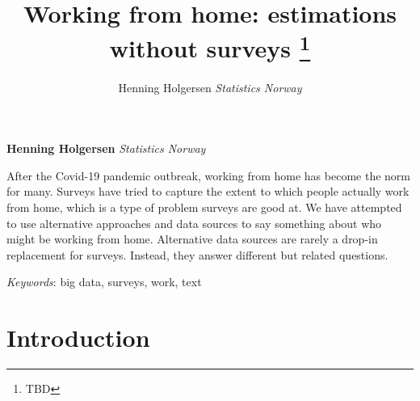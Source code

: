\documentclass[11pt,]{article}
\title{Working from home: estimations without surveys \thanks{TBD}  }
\author{\Large Henning Holgersen\vspace{0.05in} \newline\normalsize\emph{Statistics Norway}  }
\date{}
\newcommand*{\authorfont}{\fontfamily{phv}\selectfont}
\renewenvironment{abstract}
 {{%
    \setlength{\leftmargin}{0mm}
    \setlength{\rightmargin}{\leftmargin}%
  }%
  \relax}
 {\endlist}
\begin{document}
	
%

{%
\setlength{\parindent}{0pt}
\thispagestyle{plain}
{\fontsize{18}{20}\selectfont\raggedright 
\maketitle  %

}

{
   \vskip 13.5pt\relax \normalsize\fontsize{11}{12} 
\textbf{\authorfont Henning Holgersen} \hskip 15pt \emph{\small Statistics Norway}   

}

}








\begin{abstract}

    \hbox{\vrule height .2pt width 39.14pc}

    \vskip 8.5pt %

\noindent After the Covid-19 pandemic outbreak, working from home has become the
norm for many. Surveys have tried to capture the extent to which people
actually work from home, which is a type of problem surveys are good at.
We have attempted to use alternative approaches and data sources to say
something about who might be working from home. Alternative data sources
are rarely a drop-in replacement for surveys. Instead, they answer
different but related questions.


\vskip 8.5pt \noindent \emph{Keywords}: big data, surveys, work, text \par

    \hbox{\vrule height .2pt width 39.14pc}



\end{abstract}


\vskip -8.5pt



\noindent  

\hypertarget{introduction}{%
\section{Introduction}\label{introduction}}
\end{document}
